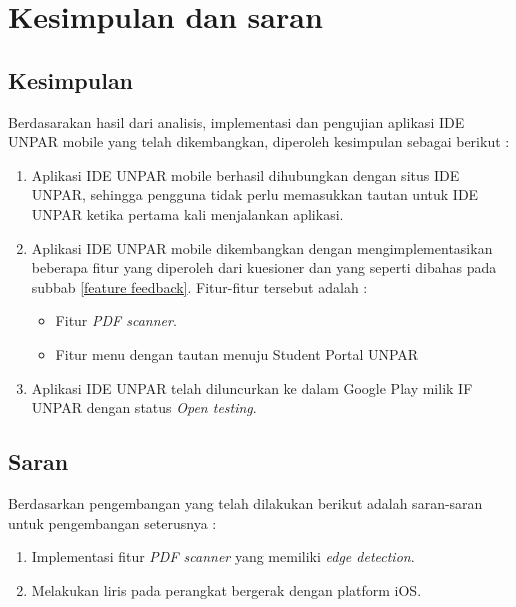 \chapter{Kesimpulan dan saran}

\section{Kesimpulan}

Berdasarakan hasil dari analisis, implementasi dan pengujian aplikasi IDE UNPAR mobile yang telah dikembangkan, diperoleh kesimpulan sebagai berikut :

\begin{enumerate}
\item Aplikasi IDE UNPAR mobile berhasil dihubungkan dengan situs IDE UNPAR, sehingga pengguna tidak perlu memasukkan tautan untuk IDE UNPAR ketika pertama kali menjalankan aplikasi.

\item Aplikasi IDE UNPAR mobile dikembangkan dengan mengimplementasikan beberapa fitur yang diperoleh dari kuesioner dan yang seperti dibahas pada subbab \ref{feature feedback}. Fitur-fitur tersebut adalah :
	\begin{itemize}
		\item Fitur \textit{PDF scanner}.
		\item  Fitur menu dengan tautan menuju Student Portal UNPAR
	\end{itemize}
	
\item Aplikasi IDE UNPAR telah diluncurkan ke dalam Google Play milik IF UNPAR dengan status \textit{Open testing}.
\end{enumerate}

\section{Saran}

Berdasarkan pengembangan yang telah dilakukan berikut adalah saran-saran untuk pengembangan seterusnya :

\begin{enumerate}
\item Implementasi fitur \textit{PDF scanner} yang memiliki \textit{edge detection}.
\item Melakukan liris pada perangkat bergerak dengan platform iOS.

\end{enumerate}

